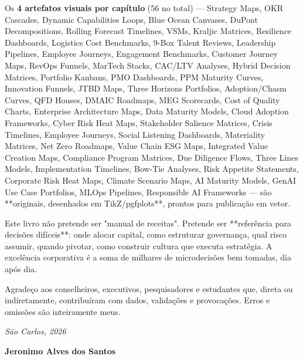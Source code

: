Os \textbf{4 artefatos visuais por capítulo} (56 no total) — Strategy Maps, OKR Cascades, Dynamic Capabilities Loops, Blue Ocean Canvases, DuPont Decompositions, Rolling Forecast Timelines, VSMs, Kraljic Matrices, Resilience Dashboards, Logistics Cost Benchmarks, 9-Box Talent Reviews, Leadership Pipelines, Employee Journeys, Engagement Benchmarks, Customer Journey Maps, RevOps Funnels, MarTech Stacks, CAC/LTV Analyses, Hybrid Decision Matrices, Portfolio Kanbans, PMO Dashboards, PPM Maturity Curves, Innovation Funnels, JTBD Maps, Three Horizons Portfolios, Adoption/Chasm Curves, QFD Houses, DMAIC Roadmaps, MEG Scorecards, Cost of Quality Charts, Enterprise Architecture Maps, Data Maturity Models, Cloud Adoption Frameworks, Cyber Risk Heat Maps, Stakeholder Salience Matrices, Crisis Timelines, Employee Journeys, Social Listening Dashboards, Materiality Matrices, Net Zero Roadmaps, Value Chain ESG Maps, Integrated Value Creation Maps, Compliance Program Matrices, Due Diligence Flows, Three Lines Models, Implementation Timelines, Bow-Tie Analyses, Risk Appetite Statements, Corporate Risk Heat Maps, Climate Scenario Maps, AI Maturity Models, GenAI Use Case Portfolios, MLOps Pipelines, Responsible AI Frameworks — são **originais, desenhados em TikZ/pgfplots**, prontos para publicação em vetor.

Este livro não pretende ser "manual de receitas". Pretende ser **referência para decisões difíceis**: onde alocar capital, como estruturar governança, qual risco assumir, quando pivotar, como construir cultura que executa estratégia. A excelência corporativa é a soma de milhares de microdecisões bem tomadas, dia após dia.

Agradeço aos conselheiros, executivos, pesquisadores e estudantes que, direta ou indiretamente, contribuíram com dados, validações e provocações. Erros e omissões são inteiramente meus.

\vspace{1cm}
\noindent\textit{São Carlos, 2026}

\noindent\textbf{Jeronimo Alves dos Santos}
